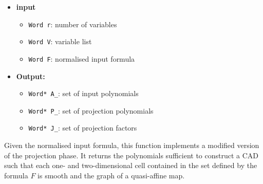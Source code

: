 \documentclass[
]{book}
\providecommand{\tightlist}{%
  \setlength{\itemsep}{0pt}\setlength{\parskip}{0pt}}
\theoremstyle{definition}
\theoremstyle{definition}
\theoremstyle{definition}
\theoremstyle{definition}
\theoremstyle{remark}
\begin{document}
\begin{itemize}
\tightlist
\item
  \textbf{input}

  \begin{itemize}
  \tightlist
  \item
    \texttt{Word\ r}: number of variables
  \item
    \texttt{Word\ V}: variable list
  \item
    \texttt{Word\ F}: normalised input formula
  \end{itemize}
\item
  \textbf{Output:}

  \begin{itemize}
  \tightlist
  \item
    \texttt{Word*\ A\_}: set of input polynomials
  \item
    \texttt{Word*\ P\_}: set of projection polynomials
  \item
    \texttt{Word*\ J\_}: set of projection factors
  \end{itemize}
\end{itemize}

Given the normalised input formula, this function implements a modified version of the projection phase. It returns the polynomials sufficient to construct a CAD such that each one- and two-dimensional cell contained in the set defined by the formula \(F\) is smooth and the graph of a quasi-affine map.
\end{document}
